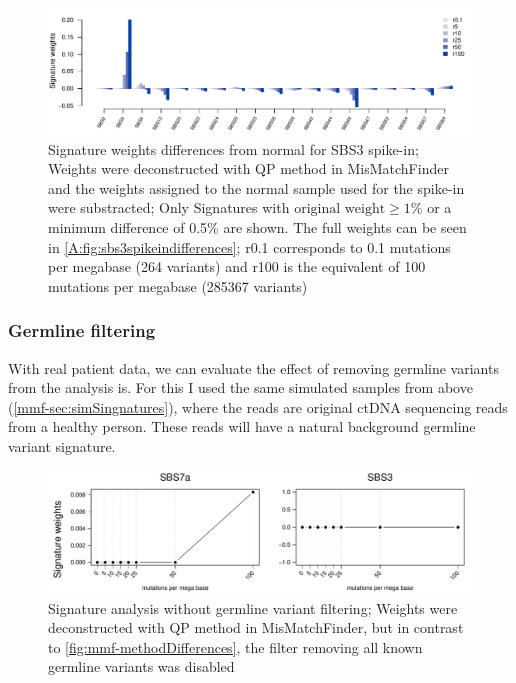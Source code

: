 \begin{figure}[!ht]
\centering
\includegraphics[width=.99\linewidth]{Figures/SBS3SpikeInSignatureDifferencesFocussed.pdf}
\caption[Signature weights differences from normal for SBS3 spike-in]{Signature weights differences from normal for SBS3 spike-in; Weights were deconstructed with QP method in MisMatchFinder and the weights assigned to the normal sample used for the spike-in were substracted; Only Signatures with $\text{original weight}\geq 1\%$ or a minimum difference of 0.5\% are shown. The full weights can be seen in \protect\autoref{A:fig:sbs3spikeindifferences}; r0.1 corresponds to 0.1 mutations per megabase (264 variants) and r100 is the equivalent of 100 mutations per megabase (285367 variants)}\label{fig:mmf-spikeSBS3signatures}
\end{figure}

\subsubsection{Germline filtering}
\label{mmf-sec:germlinefiltering}
With real patient data, we can evaluate the effect of removing germline variants from the analysis is. For this I used the same simulated samples from above (\autoref{mmf-sec:simSingnatures}), where the reads are original ctDNA sequencing reads from a healthy person. These reads will have a natural background germline variant signature.

\begin{figure}[!ht]
\centering
\includegraphics[width=.99\linewidth]{Figures/noGermlineFilterAnalysis.pdf}
\caption[Signature analysis without germline variant filtering]{Signature analysis without germline variant filtering; Weights were deconstructed with QP method in MisMatchFinder, but in contrast to \protect\autoref{fig:mmf-methodDifferences}, the filter removing all known germline variants was disabled}\label{fig:mmf-noGermlineFilterAnalysis}
\end{figure}


